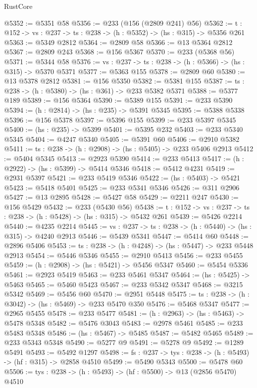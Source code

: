 \begin{lexlean}{RustCore}
\begin{coremodule}
@5352 := @5351 @58
@5356 := @233 (@156 (@2809 @241) @56)
@5362 := {t : @152} -> {vs : @237} -> {ts : @238} -> (h : @5352) -> (hs : @315) -> @5356 @261
@5363 := @5349 @2812
@5364 := @2809 @58
@5366 := @13 @5364 @2812
@5367 := @2809 @243
@5368 := @156 @5367
@5370 := @233 (@5368 @56)
@5371 := @5344 @58
@5376 := {vs : @237} -> {ts : @238} -> (h : @5366) -> (hs : @315) -> @5370 @5371
@5377 := @5363 @155
@5378 := @2809 @60
@5380 := @13 @5378 @2812
@5381 := @156 @5350
@5382 := @5381 @155
@5387 := {ts : @238} -> (h : @5380) -> (hs : @361) -> @233 @5382 @5371
@5388 := @5377 @189
@5389 := @156 @5364
@5390 := @5389 @155
@5391 := @233 @5390
@5394 := (h : @2814) -> (hs : @235) -> @5391 @5345
@5395 := @5388 @5338
@5396 := @156 @5378
@5397 := @5396 @155
@5399 := @233 @5397 @5345
@5400 := (hs : @235) -> @5399
@5401 := @5395 @232
@5403 := @233 @5340 @5345
@5404 := @4247 @5340
@5405 := @5391 @60
@5406 := @2910 @5382
@5411 := {ts : @238} -> (h : @2908) -> (hs : @5405) -> @233 @5406 @2913
@5412 := @5404 @5345
@5413 := @2923 @5390
@5414 := @233 @5413
@5417 := (h : @2922) -> (hs : @5399) -> @5414 @5346
@5418 := @5412 @4231
@5419 := @2931 @5397
@5421 := @233 @5419 @5346
@5422 := (hs : @5403) -> @5421
@5423 := @5418 @5401
@5425 := @233 @5341 @5346
@5426 := @311 @2906
@5427 := @13 @2895
@5428 := @5427 @58
@5429 := @2211 @247
@5430 := @156 @5429
@5432 := @233 (@5430 @56)
@5438 := {t : @152} -> {vs : @237} -> {ts : @238} -> (h : @5428) -> (hs : @315) -> @5432 @261
@5439 := @5426 @2214
@5440 := @4235 @2214
@5445 := {vs : @237} -> {ts : @238} -> (h : @5440) -> (hs : @315) -> @4240 @2913
@5446 := @5439 @5341
@5447 := @5414 @60
@5448 := @2896 @5406
@5453 := {ts : @238} -> (h : @4248) -> (hs : @5447) -> @233 @5448 @2913
@5454 := @5446 @5346
@5455 := @2910 @5413
@5456 := @233 @5455
@5459 := (h : @2908) -> (hs : @5421) -> @5456 @5347
@5460 := @5454 @5336
@5461 := @2923 @5419
@5463 := @233 @5461 @5347
@5464 := (hs : @5425) -> @5463
@5465 := @5460 @5423
@5467 := @233 @5342 @5347
@5468 := @3215 @5342
@5469 := @5456 @60
@5470 := @2951 @5448
@5475 := {ts : @238} -> (h : @3042) -> (hs : @5469) -> @233 @5470 @350
@5476 := @5468 @5347
@5477 := @2965 @5455
@5478 := @233 @5477
@5481 := (h : @2963) -> (hs : @5463) -> @5478 @5348
@5482 := @5476 @3043
@5483 := @2978 @5461
@5485 := @233 @5483 @5348
@5486 := (hs : @5467) -> @5485
@5487 := @5482 @5465
@5489 := @233 @5343 @5348
@5490 := @5277 @9
@5491 := @5278 @9
@5492 := @1289 @5491
@5493 := @5492 @1297
@5498 := {fs : @237} -> {tys : @238} -> (h : @5493) -> (hf : @315) -> @2858 @4510
@5499 := @5490 @5343
@5500 := @5478 @60
@5506 := {tys : @238} -> (h : @5493) -> (hf : @5500) -> @13 (@2856 @5470) @4510

\end{coremodule}
\end{lexlean}
